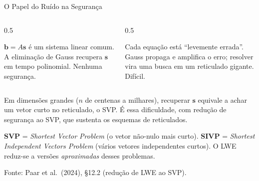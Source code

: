 \documentclass{beamer}
\begin{document}
\begin{frame}{O Papel do Ruído na Segurança}
    \begin{columns}[T]
        \begin{column}{0.5\textwidth}
            \begin{tcolorbox}[colback=red!5,colframe=red!60!black,boxrule=0.5pt,title={\footnotesize Sem ruído ($\mathbf{e}=0$)}]
                \footnotesize
                $\mathbf{b} = A\mathbf{s}$ é um sistema linear comum.\\[2pt]
                A eliminação de Gauss recupera $\mathbf{s}$ em tempo polinomial. Nenhuma segurança.
            \end{tcolorbox}
        \end{column}
        \begin{column}{0.5\textwidth}
            \begin{tcolorbox}[colback=green!6,colframe=green!50!black,boxrule=0.5pt,title={\footnotesize Com ruído ($\mathbf{e}\neq 0$)}]
                \footnotesize
                Cada equação está ``levemente errada''.\\[2pt]
                Gauss propaga e amplifica o erro; resolver vira uma busca em um reticulado gigante. Difícil.
            \end{tcolorbox}
        \end{column}
    \end{columns}
    \medskip
    \begin{tcolorbox}[colback=gray!8,colframe=gray!60!black,boxrule=0.5pt]
        \footnotesize
        Em dimensões grandes ($n$ de centenas a milhares), recuperar $\mathbf{s}$ equivale a achar um vetor curto no reticulado, o SVP. É essa dificuldade, com redução de segurança ao SVP, que sustenta os esquemas de reticulados.
    \end{tcolorbox}
    \smallskip
    {\scriptsize \textbf{SVP} = \textit{Shortest Vector Problem} (o vetor não-nulo mais curto). \textbf{SIVP} = \textit{Shortest Independent Vectors Problem} (vários vetores independentes curtos). O LWE reduz-se a versões \emph{aproximadas} desses problemas.\par}
    \smallskip
    {\tiny Fonte: Paar et al.\ (2024), §12.2 (redução de LWE ao SVP).}
\end{frame}
\end{document}
